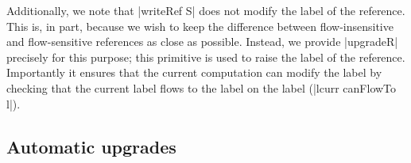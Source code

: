 %
Additionally, we note that |writeRef S| does not modify the label of the reference.
%
This is, in part, because we wish to keep the difference between
flow-insensitive and flow-sensitive references as close as possible.
%
Instead, we provide |upgradeR| precisely for this purpose; this primitive is
used to raise the label of the reference.
%
Importantly it ensures that the current computation can modify the label by
checking that the current label flows to the label on the label (|lcurr
canFlowTo l|).




\subsection{Automatic upgrades}
\label{sec:flow-sensitive:auto}

